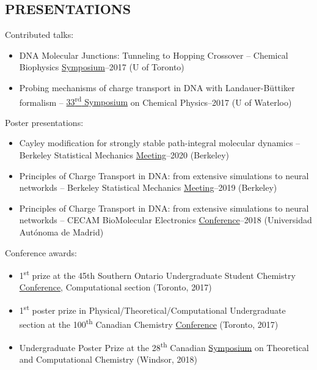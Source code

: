 \documentclass[9pt, margin]{res}
\begin{document}
\begin{resume}
\section{PRESENTATIONS}
 \bigskip Contributed talks: 
 \begin{itemize}
 \item DNA Molecular Junctions:  Tunneling to Hopping Crossover -- Chemical Biophysics \href{www.chembiophys.ca}{Symposium}--2017 (U of Toronto)
 \item Probing mechanisms of charge transport in DNA with Landauer-B\"uttiker formalism -- \href{http://scp.uwaterloo.ca}{33\textsuperscript{rd} Symposium} on Chemical Physics--2017 (U of Waterloo)
 \end{itemize}
 Poster presentations: 
 \begin{itemize}
 \item Cayley modification for strongly stable path-integral molecular dynamics -- Berkeley Statistical Mechanics  \href{http://berkeleystatmech.org/}{Meeting}--2020 (Berkeley)
 \item Principles of Charge Transport in DNA: from extensive simulations to neural networkds -- Berkeley Statistical Mechanics  \href{http://berkeleystatmech.org/}{Meeting}--2019 (Berkeley)
 \item Principles of Charge Transport in DNA: from extensive simulations to neural networkds -- CECAM BioMolecular Electronics \href{https://www.cecam.org/workshop-0-1522.html}{Conference}--2018 (Universidad Autónoma de Madrid)
 \end{itemize}
\newpage
Conference awards:
\begin{itemize}
	\item 1\textsuperscript{st} prize at the 45th Southern Ontario Undergraduate Student Chemistry \href{http://www.souscc45.ca}{Conference}, Computational section (Toronto, 2017) %
	\item 1\textsuperscript{st} poster prize in Physical/Theoretical/Computational Undergraduate section at the 100\textsuperscript{th} Canadian Chemistry \href{http://www.csc2017.ca/student-competitions-0}{Conference} (Toronto, 2017) %
	\item  Undergraduate Poster Prize at the 28\textsuperscript{th} Canadian \href{http://catc.chem.ubc.ca/home/welcome}{Symposium} on Theoretical and Computational Chemistry (Windsor, 2018) %
\end{itemize}



\end{resume}
\end{document}
